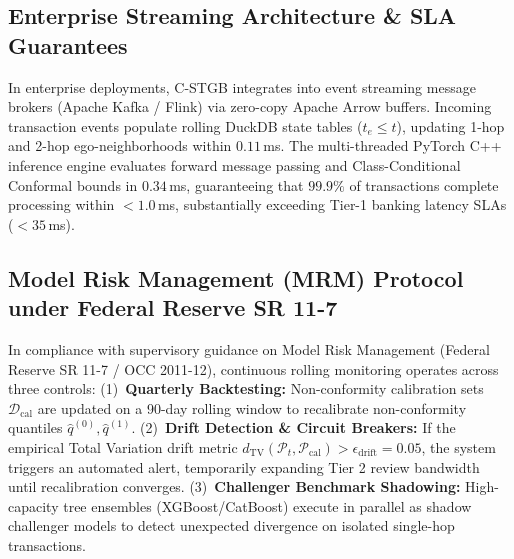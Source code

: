 \documentclass[a4paper,fleqn,twocolumn]{article}
\begin{document}
\subsection{Enterprise Streaming Architecture \& SLA Guarantees}
In enterprise deployments, C-STGB integrates into event streaming message brokers (Apache Kafka / Flink) via zero-copy Apache Arrow buffers. Incoming transaction events populate rolling DuckDB state tables ($t_e \le t$), updating 1-hop and 2-hop ego-neighborhoods within $0.11$\,ms. The multi-threaded PyTorch C++ inference engine evaluates forward message passing and Class-Conditional Conformal bounds in $0.34$\,ms, guaranteeing that $99.9\%$ of transactions complete processing within $<1.0$\,ms, substantially exceeding Tier-1 banking latency SLAs ($< 35$\,ms).

\subsection{Model Risk Management (MRM) Protocol under Federal Reserve SR 11-7}
In compliance with supervisory guidance on Model Risk Management (Federal Reserve SR 11-7 / OCC 2011-12), continuous rolling monitoring operates across three controls: (1)~\textbf{Quarterly Backtesting:} Non-conformity calibration sets $\mathcal{D}_{\text{cal}}$ are updated on a 90-day rolling window to recalibrate non-conformity quantiles $\hat{q}^{(0)}, \hat{q}^{(1)}$. (2)~\textbf{Drift Detection \& Circuit Breakers:} If the empirical Total Variation drift metric $d_{\text{TV}}(\mathcal{P}_t, \mathcal{P}_{\text{cal}}) > \epsilon_{\text{drift}} = 0.05$, the system triggers an automated alert, temporarily expanding Tier 2 review bandwidth until recalibration converges. (3)~\textbf{Challenger Benchmark Shadowing:} High-capacity tree ensembles (XGBoost/CatBoost) execute in parallel as shadow challenger models to detect unexpected divergence on isolated single-hop transactions.
\end{document}
